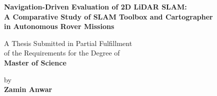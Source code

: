 \documentclass[12pt,letterpaper]{report}
\begin{document}
\begin{titlepage}
\centering
\vspace*{2cm}

{\LARGE \textbf{Navigation-Driven Evaluation of 2D LiDAR SLAM:\\
A Comparative Study of SLAM Toolbox and Cartographer\\
in Autonomous Rover Missions}}

\vspace{2cm}

{\large A Thesis Submitted in Partial Fulfillment\\
of the Requirements for the Degree of\\
\textbf{Master of Science}}

\vspace{2cm}

{\large by\\
\textbf{Zamin Anwar}}

\vspace{3cm}

{\large \the\year}

\vfill
\end{titlepage}
\end{document}
